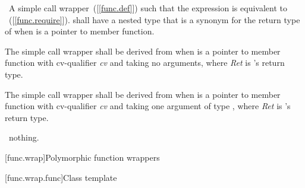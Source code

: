 \documentclass[american,twoside]{book}
\begin{document}
\begin{itemdescr}
\pnum\returns\ A simple call wrapper~([\ref{func.def}]) 
such that the expression  is equivalent
to ~([\ref{func.require}]).
 shall have a nested type  that is a synonym
for the return type of  when  is a pointer to
member function.

\pnum{}%
The simple call wrapper shall be derived
from  when  is
a pointer to member function with cv-qualifier \textit{cv} and taking no
arguments, where \textit{Ret} is 's return type.

\pnum{}%
The simple call wrapper shall be derived from
 when  is
a pointer to member function with cv-qualifier \textit{cv} and taking
one argument of type , where \textit{Ret} is 's return type.

\pnum\throws\ nothing.

\pnum{}
\end{itemdescr}

[func.wrap]{\marktr{}Polymorphic function wrappers}
%

\setcounter{subsubsection}{1}
[func.wrap.func]{Class template }
\end{document}
